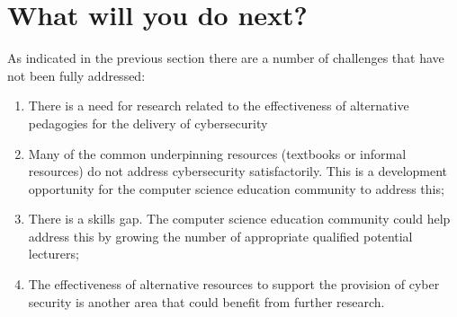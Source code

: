 \documentclass[sigconf]{acmart}
\begin{document}
\begin{comment}

The ACM/IEEE-CS Joint Task Force on Computing Curricula~\cite[p.~97]{ACM2013a} takes a distinct view on the Knowledge Areas (KAs):

\begin{quote}
	``{\emph{The Information Assurance and Security KA is unique among the set of KAs presented here
			given the manner in which the topics are pervasive throughout other KAs.}}''
\end{quote}

It proposes nine ``core'' hours and 63.5 distributed across the other KAs. Nevertheless, the situation on the ground in the USA is different~\cite{Ackerman2019a}:

\begin{quote}
	``{\emph{Universities suffer shortcomings, as well. Roughly 85 of them offer undergraduate and/or graduate degrees in cybersecurity. There is a big catch, however. Far more diversified computer science programs, which attract substantially more students, don't mandate even one cybersecurity course.}}''
\end{quote}

\end{comment}



\section {What will you do next?}	
As indicated in the previous section there are a number of challenges that have not been fully addressed:
\begin{enumerate}
	\item There is a need for research related to the effectiveness of alternative pedagogies for the delivery of cybersecurity
	\item Many of the common underpinning resources (textbooks or informal resources) do not address cybersecurity satisfactorily. This is a development opportunity for the computer science education community to address this;
	\item There is a skills gap. The computer science education community could help address this by growing the number of appropriate qualified potential lecturers;
	\item The effectiveness of alternative resources to support the provision of cyber security is another area that could benefit from further research.
\end{enumerate}
\end{document}
